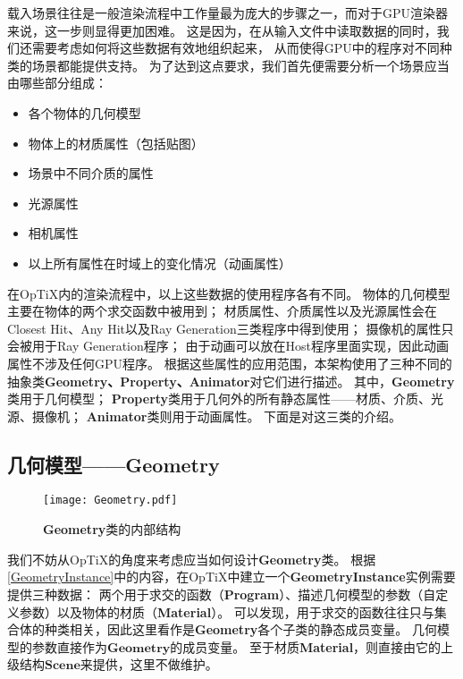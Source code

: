 载入场景往往是一般渲染流程中工作量最为庞大的步骤之一，而对于GPU渲染器来说，这一步则显得更加困难。
这是因为，在从输入文件中读取数据的同时，我们还需要考虑如何将这些数据有效地组织起来，
从而使得GPU中的程序对不同种类的场景都能提供支持。
为了达到这点要求，我们首先便需要分析一个场景应当由哪些部分组成：

\label{PropertyList}
\begin{itemize}
\item{各个物体的几何模型}
\item{物体上的材质属性（包括贴图）} 
\item{场景中不同介质的属性} 
\item{光源属性}
\item{相机属性}
\item{以上所有属性在时域上的变化情况（动画属性）}  
\end{itemize}

在OpTiX内的渲染流程中，以上这些数据的使用程序各有不同。
物体的几何模型主要在物体的两个求交函数中被用到；
材质属性、介质属性以及光源属性会在Closest Hit、Any Hit以及Ray Generation三类程序中得到使用；
摄像机的属性只会被用于Ray Generation程序；
由于动画可以放在Host程序里面实现，因此动画属性不涉及任何GPU程序。
根据这些属性的应用范围，本架构使用了三种不同的抽象类\textbf{Geometry、Property、Animator}对它们进行描述。
其中，\textbf{Geometry}类用于几何模型；
\textbf{Property}类用于几何外的所有静态属性——材质、介质、光源、摄像机；
\textbf{Animator}类则用于动画属性。
下面是对这三类的介绍。

\subsection{几何模型——Geometry}


\begin{figure}[h]
    \centering
    \texttt{[image: Geometry.pdf]}
    \caption{\textbf{Geometry}类的内部结构}
    \label{tab:geometry}
\end{figure}

我们不妨从OpTiX的角度来考虑应当如何设计\textbf{Geometry}类。
根据\ref{GeometryInstance}中的内容，在OpTiX中建立一个\textbf{GeometryInstance}实例需要提供三种数据：
两个用于求交的函数（\textbf{Program}）、描述几何模型的参数（自定义参数）以及物体的材质（\textbf{Material}）。
可以发现，用于求交的函数往往只与集合体的种类相关，因此这里看作是\textbf{Geometry}各个子类的静态成员变量。
几何模型的参数直接作为$\textbf{Geometry}$的成员变量。
至于材质\textbf{Material}，则直接由它的上级结构$\textbf{Scene}$来提供，这里不做维护。

